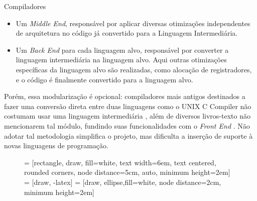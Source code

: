 \begin{section}{Compiladores}
\begin{itemize}
    \item Um \textit{Middle End}, responsável por aplicar diversas otimizações
independentes de arquitetura no código já convertido para a Linguagem Intermediária.

    \item Um \textit{Back End} para cada linguagem alvo, responsável por converter a linguagem intermediária
na linguagem alvo. Aqui outras otimizações específicas da linguagem alvo são realizadas,
como alocação de registradores, e o código é finalmente convertido para a linguagem alvo.

\end{itemize}

Porém, essa modularização é opcional: compiladores mais antigos destinados a fazer uma
conversão direta entre duas linguagens como o UNIX C Compiler  não costumam usar uma linguagem
intermediária \citep{ritchie1979tour}, além de diversos livros-texto não mencionarem tal módulo, fundindo suas
funcionalidades com o \textit{Front End} \citep{dragonbook}. Não adotar tal metodologia
simplifica o projeto, mas dificulta a inserção de suporte à novas
linguagens de programação. 


\begin{figure}
 = [rectangle, draw, fill=white,
    text width=6em, text centered, rounded corners, node distance=5cm, auto, minimum height=2em]
 = [draw, -latex]
 = [draw, ellipse,fill=white, node distance=2cm,
    minimum height=2em]

\begin{center}
\end{center}
\end{figure}
\end{section}
